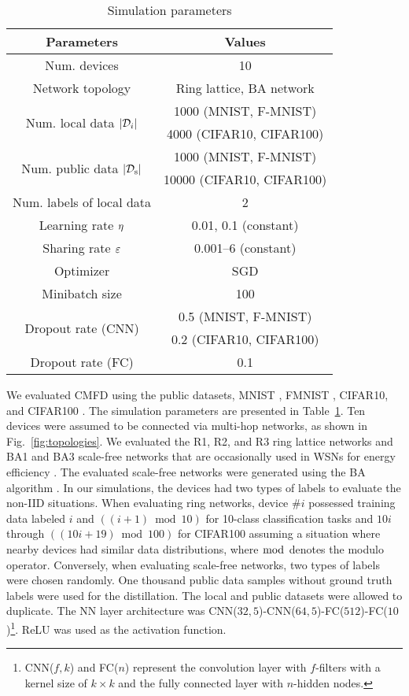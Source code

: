 \documentclass[journal]{IEEEtran}
\begin{document}
\begin{table}[!t]
\caption{Simulation parameters}
\label{tbl:sim_param1}
\centering
\begin{tabular}{cc}
\toprule
Parameters & Values \\
\midrule
Num. devices & 10 \\
Network topology & Ring lattice, BA network \\
\multirow{2}{*}{Num. local data $\vert{\mathcal{D}_i}\vert$} & 1000 (MNIST, F-MNIST) \\
                                               & 4000 (CIFAR10, CIFAR100) \\
\multirow{2}{*}{Num. public data $\vert{\mathcal{D}_\mathrm{s}}\vert$} & 1000 (MNIST, F-MNIST) \\
                                                    & 10000 (CIFAR10, CIFAR100) \\
Num. labels of local data & 2 \\
Learning rate $\eta$ & 0.01, 0.1 (constant) \\
Sharing rate $\varepsilon$ & 0.001--6 (constant) \\
Optimizer & SGD \\
Minibatch size & 100 \\
\multirow{2}{*}{Dropout rate (CNN)} & 0.5 (MNIST, F-MNIST) \\
                                    & 0.2 (CIFAR10, CIFAR100) \\
Dropout rate (FC) & 0.1 \\
\bottomrule
\end{tabular}
\end{table}

We evaluated \gls{CMFD} using the public datasets, MNIST \cite{lecun1998gradient}, \gls{FMNIST} \cite{xiao2017fashion}, CIFAR10, and CIFAR100 \cite{krizhevsky2009learning}.
The simulation parameters are presented in Table~\ref{tbl:sim_param1}.
Ten devices were assumed to be connected via multi-hop networks, as shown in Fig.~\ref{fig:topologies}.
We evaluated the R1, R2, and R3 ring lattice networks and BA1 and BA3 scale-free networks
that are occasionally used in \glspl{WSN} for energy efficiency \cite{zhu2009complex}.
The evaluated scale-free networks were generated using the \gls{BA} algorithm \cite{barabasi1999emergence}.
In our simulations, the devices had two types of labels to evaluate the non-\gls{IID} situations.
When evaluating ring networks,
device $\#i$ possessed training data labeled $i$ and $((i+1) \bmod 10)$ for 10-class classification tasks
and $10 i$ through $((10 i + 19) \bmod 100)$ for CIFAR100
assuming a situation where nearby devices had similar data distributions,
where $\bmod$ denotes the modulo operator.
Conversely, when evaluating scale-free networks,
two types of labels were chosen randomly.
One thousand public data samples without ground truth labels were used for the distillation.
The local and public datasets were allowed to duplicate.
The \gls{NN} layer architecture was CNN($32, 5$)-CNN($64, 5$)-FC($512$)-FC($10$)\footnote{CNN($f, k$) and FC($n$) represent the convolution layer with $f$-filters with a kernel size of $k\times k$ and the fully connected layer with $n$-hidden nodes.}.
ReLU was used as the activation function.
\end{document}
